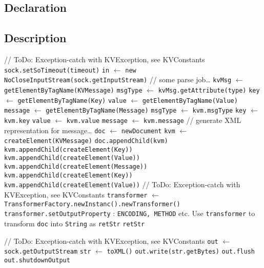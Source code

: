 \documentclass{article}
\begin{document}
\subsection{Declaration}
\subsection{Description}
\begin{algorithm}
	\begin{algorithmic}
			\State // ToDo: Exception-catch with KVException, see KVConstants
			\State \texttt{sock.setSoTimeout(timeout)}
			\State \texttt{in} $\leftarrow$ \texttt{new NoCloseInputStream(sock.getInputStream)}
			\State // some parse job\dots
			\State \texttt{kvMsg} $\leftarrow$ \texttt{getElementByTagName(KVMessage)}
			\State \texttt{msgType} $\leftarrow$ \texttt{kvMsg.getAttribute(type)}
			\State \texttt{key} $\leftarrow$ \texttt{getElementByTagName(Key)}
			\State \texttt{value} $\leftarrow$ \texttt{getElementByTagName(Value)}
			\State \texttt{message} $\leftarrow$ \texttt{getElementByTagName(Message)}
		\EndProcedure
			\State \texttt{msgType} $\leftarrow$ \texttt{kvm.msgType}
			\State \texttt{key} $\leftarrow$ \texttt{kvm.key}
			\State \texttt{value} $\leftarrow$ \texttt{kvm.value}
			\State \texttt{message} $\leftarrow$ \texttt{kvm.message}
		\EndProcedure
			\State // generate XML representation for message\dots
			\State \texttt{doc} $\leftarrow$ \texttt{newDocument}
			\State \texttt{kvm} $\leftarrow$ \texttt{createElement(KVMessage)}
			\State \texttt{doc.appendChild(kvm)}
					\State \texttt{kvm.appendChild(createElement(Key))}
				\EndIf
					\State \texttt{kvm.appendChild(createElement(Value))}
				\EndIf
					\State \texttt{kvm.appendChild(createElement(Message))}
				\EndIf
			\Else
				\State \texttt{kvm.appendChild(createElement(Key))}
					\State \texttt{kvm.appendChild(createElement(Value))}
					\State // ToDo: Exception-catch with KVException, see KVConstants
				\EndIf
			\EndIf
			\State \texttt{transformer} $\leftarrow$ \texttt{TransformerFactory.newInstanc().newTransformer()}
			\State \texttt{transformer.setOutputProperty} : \texttt{ENCODING, METHOD} etc.
			\State Use \texttt{transformer} to transform \texttt{doc} into \texttt{String} as \texttt{retStr}
			\State \Return \texttt{retStr}
		\EndProcedure
	\end{algorithmic}
\end{algorithm}
\begin{algorithm}
	\begin{algorithmic}
		\Procedure{sendMessage}{Socket sock}
			\State // ToDo: Exception-catch with KVException, see KVConstants
			\State \texttt{out} $\leftarrow$ \texttt{sock.getOutputStream}
			\State \texttt{str} $\leftarrow$ \texttt{toXML()}
			\State \texttt{out.write(str.getBytes)}
			\State \texttt{out.flush}
			\State \texttt{out.shutdownOutput}
		\EndProcedure
	\end{algorithmic}
\end{algorithm}
\end{document}

